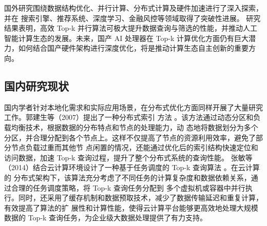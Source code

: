 国外研究围绕数据结构优化、并行计算、分布式计算及硬件加速进行了深入探索，并在 搜索引擎、推荐系统、深度学习、金融风控等领域取得了突破性进展。
研究结果表明，高效 Top-k 并行算法可极大提升数据查询与筛选的性能，并推动人工智能计算生态的发展。未来，国产 AI 处理器在 Top-k 计算优化方面仍有巨大潜力，如何结合国产硬件架构进行深度优化，将是推动计算生态自主创新的重要方向。









\subsection{国内研究现状}



国内学者针对本地化需求和实际应用场景，在分布式优化方面同样开展了大量研究工作。郭建生等（2007）提出了一种分布式索引
方法 \cite {guo2007}。该方法通过动态分区和负载均衡技术，根据数据的分布特点和节点的处理能力，动
态地将数据划分为多个分区，并合理分配到各个节点上。这样不仅提高了节点的资源利用效率，避免了部分节点负载过重而其他节
点闲置的情况，还能通过优化后的索引结构快速定位和访问数据，加速 Top-k 查询过程，提升了整个分布式系统的查询性能。
张敏等（2014）结合云计算环境设计了一种基于任务调度的 Top-k 查询算法 \cite {zhang2014}。在云计算的
分布式架构下，该算法充分考虑了不同任务的计算复杂度和数据依赖关系，通过合理的任务调度策略，将 Top-k 查询任务分配到
多个虚拟机或容器中并行执行。同时，还采用了缓存机制和数据预取技术，减少了数据传输延迟和重复计算，有效提高了算法的扩
展性和计算性能，使得云计算平台能够更高效地处理大规模数据的 Top-k 查询任务，为企业级大数据处理提供了有力支持。

